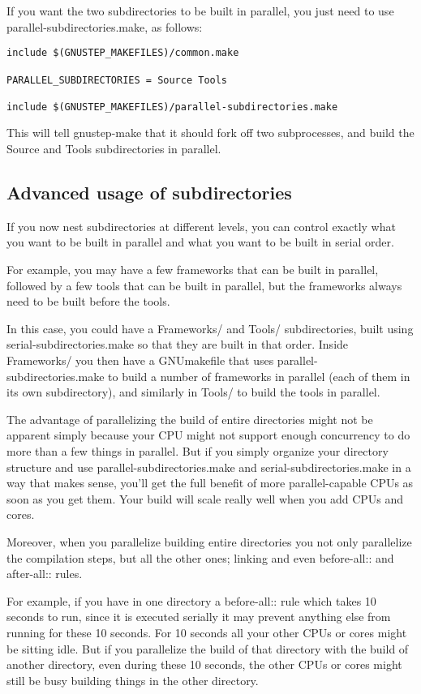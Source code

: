 \documentclass[a4paper]{article}
\begin{document}
If you want the two subdirectories to be built in parallel, you just
need to use parallel-subdirectories.make, as follows:

\begin{verbatim}
include $(GNUSTEP_MAKEFILES)/common.make

PARALLEL_SUBDIRECTORIES = Source Tools

include $(GNUSTEP_MAKEFILES)/parallel-subdirectories.make
\end{verbatim}

This will tell gnustep-make that it should fork off two subprocesses,
and build the Source and Tools subdirectories in parallel.

\subsection{Advanced usage of subdirectories}
If you now nest subdirectories at different levels, you can control
exactly what you want to be built in parallel and what you want to be
built in serial order.

For example, you may have a few frameworks that can be built in
parallel, followed by a few tools that can be built in parallel, but
the frameworks always need to be built before the tools.

In this case, you could have a Frameworks/ and Tools/ subdirectories,
built using serial-subdirectories.make so that they are built in that
order.  Inside Frameworks/ you then have a GNUmakefile that uses
parallel-subdirectories.make to build a number of frameworks in
parallel (each of them in its own subdirectory), and similarly in
Tools/ to build the tools in parallel.

The advantage of parallelizing the build of entire directories might
not be apparent simply because your CPU might not support enough
concurrency to do more than a few things in parallel.  But if you
simply organize your directory structure and use
parallel-subdirectories.make and serial-subdirectories.make in a way
that makes sense, you'll get the full benefit of more parallel-capable
CPUs as soon as you get them.  Your build will scale really well when
you add CPUs and cores.

Moreover, when you parallelize building entire directories you not
only parallelize the compilation steps, but all the other ones;
linking and even before-all:: and after-all:: rules.

For example, if you have in one directory a before-all:: rule which
takes 10 seconds to run, since it is executed serially it may prevent
anything else from running for these 10 seconds.  For 10 seconds all
your other CPUs or cores might be sitting idle.  But if you
parallelize the build of that directory with the build of another
directory, even during these 10 seconds, the other CPUs or cores might
still be busy building things in the other directory.
\end{document}
